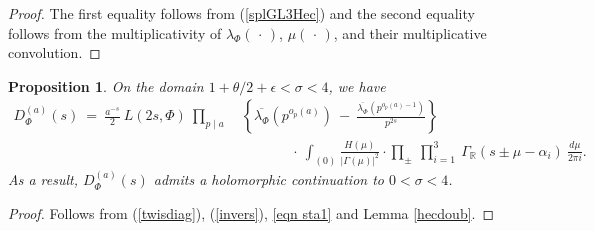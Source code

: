 \documentclass[11pt,reqno]{amsart}
\newtheorem{prop}[thm]{Proposition}
\theoremstyle{definition}
\theoremstyle{definition}
\theoremstyle{remark}
\newcommand{\R}{\ensuremath{\mathbb{R}}}
\numberwithin{equation}{section}
\begin{document}
 	 
 	 
 	 \begin{proof}
 	 	The first equality follows from (\ref{splGL3Hec}) and the second equality follows from the multiplicativity  of $\lambda_{\Phi}(\,\cdot\, )$, $\mu(\,\cdot\, )$, and their  multiplicative convolution. 
 	 \end{proof}
 	
 	
 	\begin{prop}\label{maintwisdiag}
 		On the domain  $1+ \theta/2 +\epsilon< \sigma < 4$, we have
 		 \begin{align}\label{twisdiaMT}
 			D_{\Phi}^{(a)}(s) \ = \ \frac{ a^{-s}}{2}  \ L(2s, \Phi) \   \prod_{p\mid a} \ & \left\{  \overline{\lambda_{\Phi}}\left(p^{o_{p}(a)}\right) \ - \   \frac{\overline{\lambda_{\Phi}}\left(p^{o_{p}(a)-1}\right) }{p^{2s}} \right\}	\nonumber\\
 		&	\hspace{40pt}\  \cdot \   \int_{(0)}  \frac{H(\mu)}{|\Gamma(\mu)|^2} \cdot \prod_{\pm} \ \prod_{i=1}^{3} \  \Gamma_{\R}\left(s\pm \mu-\alpha_{i}\right)\ \frac{d\mu}{2\pi i}. 
 		\end{align}
 	As a result,  $	D_{\Phi}^{(a)}(s) $  admits a holomorphic continuation to $0< \sigma < 4$. 
 	\end{prop}
 
 \begin{proof}
 	Follows from (\ref{twisdiag}),  (\ref{invers}), \eqref{eqn sta1} and Lemma \ref{hecdoub}. 
 \end{proof}


 	 
 	
 	
 
\end{document}
